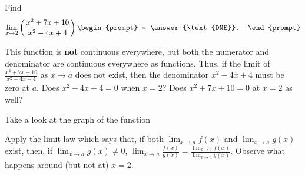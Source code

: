 \documentclass{ximera}
\author{Gregory Hartman \and Matthew Carr}
\begin{document}
\begin{exercise}




  Find 
  \[
  \lim_{x\to 2} \left({\frac{x^2+7x+10}{x^2-4x+4}}\right)
  \begin{prompt}
  = \answer{\text{DNE}}.
  \end{prompt}
  \]
    \begin{hint}
     This function is \textbf{not} continuous everywhere, but both the numerator and denominator are continuous everywhere as functions. Thus, if the limit of $\frac{x^2+7x+10}{x^2-4x+4}$ as $x\to{a}$ does not exist, then the denominator $x^2-4x+4$ must be zero at $a$. Does $x^2-4x+4=0$ when $x=2$? Does $x^2+7x+10=0$ at $x=2$ as well?
    \end{hint}
     \begin{hint}
    	Take a look at the graph of the function
    \begin{center}
      \end{center} 
      Apply the limit law which says that, if both $\lim_{x\to a}f(x)$ and $\lim_{x\to a}g(x)$ exist, then, if $\lim_{x\to a}g(x)\ne0$, $\lim_{x\to{a}}\frac{f(x)}{g(x)}=\frac{\lim_{x\to a}f(x)}{\lim_{x\to{a}}g(x)}$. Observe what happens around (but not at) $x=2$.
    \end{hint}
    \begin{hint}

\end{hint}
\end{exercise}
\end{document}
